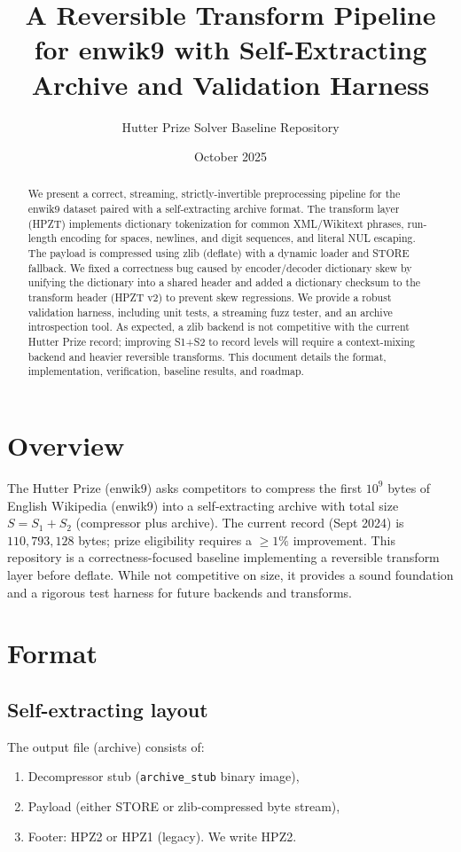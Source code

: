 \documentclass[11pt]{article}
\title{A Reversible Transform Pipeline for enwik9 with Self-Extracting Archive and Validation Harness}
\author{Hutter Prize Solver Baseline Repository}
\date{October 2025}
\begin{document}
\maketitle

\begin{abstract}
We present a correct, streaming, strictly-invertible preprocessing pipeline for the enwik9 dataset paired with a self-extracting archive format. The transform layer (HPZT) implements dictionary tokenization for common XML/Wikitext phrases, run-length encoding for spaces, newlines, and digit sequences, and literal NUL escaping. The payload is compressed using zlib (deflate) with a dynamic loader and STORE fallback. We fixed a correctness bug caused by encoder/decoder dictionary skew by unifying the dictionary into a shared header and added a dictionary checksum to the transform header (HPZT v2) to prevent skew regressions. We provide a robust validation harness, including unit tests, a streaming fuzz tester, and an archive introspection tool. As expected, a zlib backend is not competitive with the current Hutter Prize record; improving S1+S2 to record levels will require a context-mixing backend and heavier reversible transforms. This document details the format, implementation, verification, baseline results, and roadmap.
\end{abstract}

\section{Overview}
The Hutter Prize (enwik9) asks competitors to compress the first $10^9$ bytes of English Wikipedia (enwik9) into a self-extracting archive with total size $S = S_1 + S_2$ (compressor plus archive). The current record (Sept 2024) is $110{,}793{,}128$ bytes; prize eligibility requires a $\geq1\%$ improvement. This repository is a correctness-focused baseline implementing a reversible transform layer before deflate. While not competitive on size, it provides a sound foundation and a rigorous test harness for future backends and transforms.

\section{Format}
\subsection{Self-extracting layout}
The output file (archive) consists of:
\begin{enumerate}[nosep]
  \item Decompressor stub (\texttt{archive\_stub} binary image),
  \item Payload (either STORE or zlib-compressed byte stream),
  \item Footer: HPZ2 or HPZ1 (legacy). We write HPZ2.
\end{enumerate}
\end{document}
